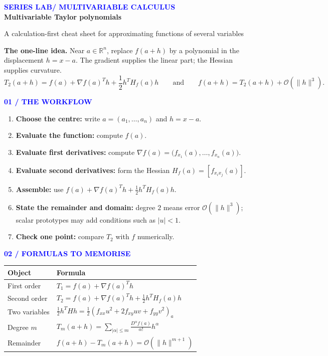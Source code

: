 \documentclass[10.5pt]{article}
\newcommand{\tagline}[1]{\par\medskip\textcolor{blue}{\sffamily\footnotesize\bfseries #1}\par\vspace{1pt}}
\begin{document}
\thispagestyle{empty}
{\sffamily\footnotesize\bfseries\textcolor{blue}{SERIES LAB\hspace{7pt}/\hspace{7pt} MULTIVARIABLE CALCULUS}}\\[-1pt]
{\fontsize{27}{30}\selectfont\bfseries Multivariable Taylor polynomials}\par
{\large\color{cyan}A calculation-first cheat sheet for approximating functions of several variables}\par\vspace{4mm}
\begin{bluebox}
\textbf{The one-line idea.} Near $a\in\mathbb R^n$, replace $f(a+h)$ by a polynomial in the displacement $h=x-a$. The gradient supplies the linear part; the Hessian supplies curvature.
\[
\boxed{\displaystyle T_2(a+h)=f(a)+\nabla f(a)^T h+\frac12h^T H_f(a)h}\qquad\text{and}\qquad f(a+h)=T_2(a+h)+\mathcal O(\|h\|^3).
\]
\end{bluebox}
\tagline{01 / THE WORKFLOW}
\begin{enumerate}[leftmargin=*,itemsep=2pt,topsep=2pt]
\item \textbf{Choose the centre:} write $a=(a_1,\ldots,a_n)$ and $h=x-a$.
\item \textbf{Evaluate the function:} compute $f(a)$.
\item \textbf{Evaluate first derivatives:} compute $\nabla f(a)=\bigl(f_{x_1}(a),\ldots,f_{x_n}(a)\bigr)$.
\item \textbf{Evaluate second derivatives:} form the Hessian $H_f(a)=[f_{x_ix_j}(a)]$.
\item \textbf{Assemble:} use $f(a)+\nabla f(a)^Th+\tfrac12h^TH_f(a)h$.
\item \textbf{State the remainder and domain:} degree $2$ means error $\mathcal O(\|h\|^3)$; scalar prototypes may add conditions such as $|u|<1$.
\item \textbf{Check one point:} compare $T_2$ with $f$ numerically.
\end{enumerate}
\tagline{02 / FORMULAS TO MEMORISE}
\begin{center}
\renewcommand{\arraystretch}{1.25}
\begin{tabular}{>{\raggedright\arraybackslash}p{.28\linewidth} p{.63\linewidth}}
\toprule
\textbf{Object} & \textbf{Formula}\\\midrule
First order & $T_1=f(a)+\nabla f(a)^T h$\\
Second order & $T_2=f(a)+\nabla f(a)^T h+\frac12h^TH_f(a)h$\\
Two variables & $\frac12h^THh=\frac12(f_{xx}u^2+2f_{xy}uv+f_{yy}v^2)_a$\\
Degree $m$ & $\displaystyle T_m(a+h)=\sum_{|\alpha|\le m}\frac{D^\alpha f(a)}{\alpha!}h^\alpha$\\
Remainder & $f(a+h)-T_m(a+h)=\mathcal O(\|h\|^{m+1})$\\
\bottomrule
\end{tabular}
\end{center}
\end{document}
